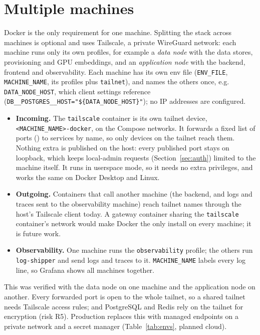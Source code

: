 \documentclass[11pt,letterpaper]{report}
\begin{document}
\section{Multiple machines}\label{sec:multi-machine}
Docker is the only requirement for one machine. Splitting the stack across machines is optional and
uses Tailscale, a private WireGuard network: each machine runs only its own profiles, for example a
\emph{data node} with the data stores, provisioning and GPU embeddings, and an \emph{application node}
with the backend, frontend and observability. Each machine has its own env file (\texttt{ENV\_FILE},
\texttt{MACHINE\_NAME}, its profiles plus \texttt{tailnet}), and names the others once, e.g.
\texttt{DATA\_NODE\_HOST}, which client settings reference
(\texttt{DB\_\_POSTGRES\_\_HOST="\$\{DATA\_NODE\_HOST\}"}); no IP addresses are configured.

\begin{itemize}
  \item \textbf{Incoming.} The \texttt{tailscale} container is its own tailnet device,
  \texttt{<MACHINE\_NAME>-docker}, on the Compose networks. It forwards a fixed list of ports
  () to services by name, so only devices on the tailnet reach them.
  Nothing extra is published on the host: every published port stays on loopback, which keeps
  local-admin requests (Section~\ref{sec:auth}) limited to the machine itself. It runs in userspace
  mode, so it needs no extra privileges, and works the same on Docker Desktop and Linux.
  \item \textbf{Outgoing.} Containers that call another machine (the backend, and logs and traces
  sent to the observability machine) reach tailnet names through the host's Tailscale client today.
  A gateway container sharing the \texttt{tailscale} container's network would make Docker the only
  install on every machine; it is future work.
  \item \textbf{Observability.} One machine runs the \texttt{observability} profile; the others run
  \texttt{log-shipper} and send logs and traces to it. \texttt{MACHINE\_NAME} labels every log line, so
  Grafana shows all machines together.
\end{itemize}

This was verified with the data node on one machine and the application node on another. Every
forwarded port is open to the whole tailnet, so a shared tailnet needs Tailscale access rules; and
PostgreSQL and Redis rely on the tailnet for encryption (risk R5). Production replaces this with
managed endpoints on a private network and a secret manager (Table~\ref{tab:envs}, planned cloud).
\end{document}
